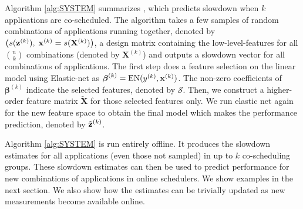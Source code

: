   
Algorithm \ref{alg:SYSTEM} summarizes \SYSTEM{}, which predicts
slowdown when $k$ applications are co-scheduled. The algorithm takes a
few samples of random combinations of applications running together,
denoted by $\left( s(\mathbf{z}^{(k)}), \; \mathbf{x}^{(k)} = s(\mathbf{X}^{(k)})
\right)$, a design matrix containing the low-level-features for all
${n \choose k}$ combinations (denoted by $\mathbf{X}^{(k)}$) and
outputs a slowdown vector for all combinations of applications. The
first step does a feature selection on the linear model using
Elastic-net as $\boldsymbol{\beta}^{(k)} = \text{EN}(y^{(k)},
\mathbf{x}^{(k)})$. The non-zero coefficients of $\boldsymbol{\beta}^{(k)}$
indicate the selected features, denoted by $\mathcal{S}$. Then, we
construct a higher-order feature matrix $\tilde{\mathbf{X}}$ for those
selected features only. We run elastic net again for the new feature
space to obtain the final model which makes the performance
prediction, denoted by $\hat{\mathbf{z}}^{(k)}$.
 


Algorithm \ref{alg:SYSTEM} is run entirely offline.  It produces the
slowdown estimates for all applications (even those not sampled) in up
to $k$ co-scheduling groups.  These slowdown estimates can then be
used to predict performance for new combinations of applications in
online schedulers.  We show examples in the next section.  We also
show how the estimates can be trivially updated as new measurements
become available online.



